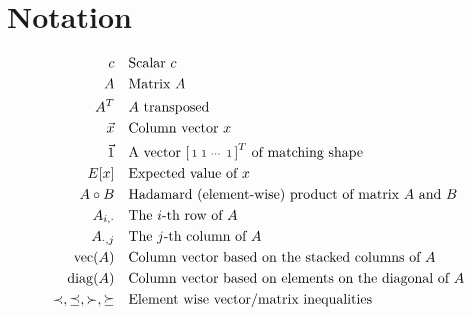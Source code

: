 \chapter{Notation}
\begin{align*}
  c & \quad \text{Scalar $c$} \\
  A & \quad \text{Matrix $A$} \\
  A^T & \quad \text{$A$ transposed} \\
  \vec{x} & \quad \text{Column vector $x$} \\
  \vec{1} & \quad \text{A vector $\left[\begin{smallmatrix} 1 & 1 & \cdots & 1\\ \end{smallmatrix}\right]^T$ 
  of matching shape}\\
  E[x] & \quad \text{Expected value of $x$} \\
  A \circ B & \quad 
    \text{Hadamard (element-wise) product of matrix $A$ and $B$} \\
  A_{i,\cdot} & \quad \text{The $i$-th row of $A$} \\
  A_{\cdot,j} & \quad \text{The $j$-th column of $A$} \\
  \operatorname{vec}(A) & \quad \text{Column vector based on the stacked columns of $A$} \\
  \operatorname{diag}(A) & \quad \text{Column vector based on elements on the diagonal of $A$} \\
  \prec, \preceq, \succ, \succeq & \quad \text{Element wise vector/matrix inequalities}
\end{align*}
